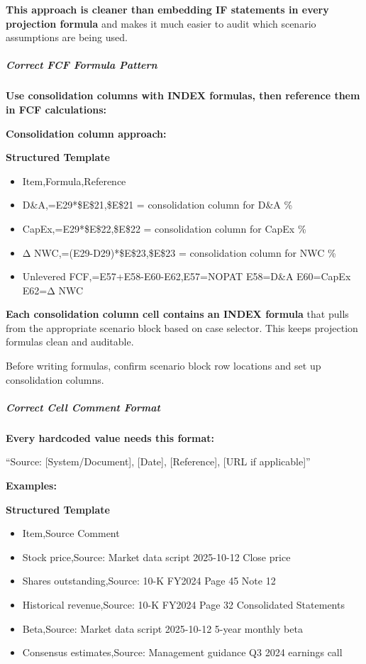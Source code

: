 \documentclass[11pt]{article}
\begin{document}
\textbf{This approach is cleaner than embedding IF statements in every projection formula} and makes it much easier to audit which scenario assumptions are being used.


\subparagraph{Correct FCF Formula Pattern}\mbox{}\par

\textbf{Use consolidation columns with INDEX formulas, then reference them in FCF calculations:}


\textbf{Consolidation column approach:}

\textbf{Structured Template}
\begin{itemize}[leftmargin=*,itemsep=2pt,topsep=2pt]
\item {} Item,Formula,Reference
\item {} D\&A,=E29*\$E\$21,\$E\$21 = consolidation column for D\&A \%
\item {} CapEx,=E29*\$E\$22,\$E\$22 = consolidation column for CapEx \%
\item {} Δ NWC,=(E29-D29)*\$E\$23,\$E\$23 = consolidation column for NWC \%
\item {} Unlevered FCF,=E57+E58-E60-E62,E57=NOPAT E58=D\&A E60=CapEx E62=Δ NWC
\end{itemize}

\textbf{Each consolidation column cell contains an INDEX formula} that pulls from the appropriate scenario block based on case selector. This keeps projection formulas clean and auditable.


Before writing formulas, confirm scenario block row locations and set up consolidation columns.


\subparagraph{Correct Cell Comment Format}\mbox{}\par

\textbf{Every hardcoded value needs this format:}


``Source: [System/Document], [Date], [Reference], [URL if applicable]''


\textbf{Examples:}

\textbf{Structured Template}
\begin{itemize}[leftmargin=*,itemsep=2pt,topsep=2pt]
\item {} Item,Source Comment
\item {} Stock price,Source: Market data script 2025-10-12 Close price
\item {} Shares outstanding,Source: 10-K FY2024 Page 45 Note 12
\item {} Historical revenue,Source: 10-K FY2024 Page 32 Consolidated Statements
\item {} Beta,Source: Market data script 2025-10-12 5-year monthly beta
\item {} Consensus estimates,Source: Management guidance Q3 2024 earnings call
\end{itemize}
\end{document}
